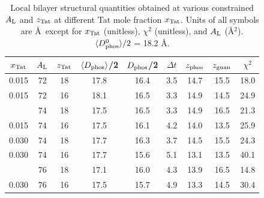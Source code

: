 \begin{table}[htbp]
  \centering
  \begin{tabular}{ccccccccc}
    \hline
    \rule{0pt}{14pt} %
    $\xTat$ & $\AL$ & $\zTat$ & $\langle D_\text{phos}\rangle$/2 & $D_\text{phos}$/2 & $\Delta t$ & $z_\textrm{phos}$ & $z_\textrm{guan}$ & $\chi^2$ \\
    \hline   
    0.015 & 72 & 18 & 17.8 & 16.4 & 3.5 & 14.7 & 15.5 & 18.0 \\ 
    0.015 & 72 & 16 & 18.1 & 16.5 & 3.3 & 14.9 & 14.5 & 24.9 \\
    \hdashline
    0.015 & 74 & 18 & 17.5 & 16.5 & 3.3 & 14.9 & 16.5 & 21.3 \\
    0.015 & 74 & 16 & 17.5 & 16.1 & 4.2 & 14.0 & 13.5 & 25.9 \\
    \hline                                                   
    0.030 & 74 & 18 & 17.7 & 16.3 & 3.7 & 14.5 & 15.5 & 24.3 \\ 
    0.030 & 74 & 16 & 17.7 & 15.6 & 5.1 & 13.1 & 13.5 & 40.1 \\
    \hdashline
    0.030 & 76 & 18 & 17.1 & 16.0 & 4.3 & 13.9 & 16.5 & 14.8 \\
    0.030 & 76 & 16 & 17.5 & 15.7 & 4.9 & 13.3 & 14.5 & 30.4 \\
    \hline
  \end{tabular}
  \caption[Local bilayer structural quantities obtained at various
  constrained $\AL$ and $\zTat$ at different Tat mole fraction $\xTat$]
  {Local bilayer structural quantities obtained at various
  constrained $\AL$ and $\zTat$ at different Tat mole fraction $\xTat$.
  Units of all symbols are \AA\ except for $\xTat$ (unitless), 
  $\chi^2$ (unitless), and $\AL$ (\AA$^2$). 
  $\langle D_\text{phos}^0\rangle/2$ = 18.2 \AA.}
  \label{tab:local_thickness}
\end{table}

